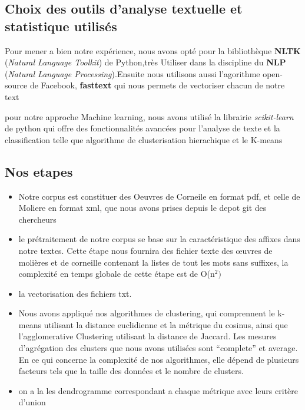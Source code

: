 \documentclass[]{report}
\begin{document}
\subsection{Choix des outils d'analyse textuelle et statistique utilisés}
\vspace{\baselineskip}
\hspace{0,5cm} Pour mener a bien notre expérience, nous avons opté pour la
bibliothèque  \textbf{NLTK} (\textit{Natural Language Toolkit}) de Python,très
Utiliser dans la discipline du \textbf{NLP} (\textit{Natural Language
Processing}).Ensuite nous utilisons aussi l'agorithme open-source de Facebook,
\textbf{fasttext} qui nous permets de vectoriser chacun de notre text

pour notre approche Machine learning, nous avons utilisé la librairie
\textit{scikit-learn} de python qui offre des fonctionnalités avancées pour
l'analyse de texte et la classification telle que algorithme de clusterisation
hierachique et le K-means 
\subsection{Nos etapes } 

\begin{itemize}
\item Notre corpus est constituer des Oeuvres de Corneile en format pdf, et
celle de Moliere  en format xml, que nous avons prises depuis le depot git des
chercheurs 
\item le prétraitement de notre corpus se base sur la caractéristique des
affixes dans notre textes. Cette étape nous fournira des fichier texte des
œuvres de molières et de corneille contenant la listes de tout les mots sans
suffixes, la complexité en temps globale de cette étape est de O(n\(^2)\)
\item la vectorisation des fichiers txt.
\item Nous avons appliqué nos algorithmes de clustering, qui comprennent le
k-means utilisant la distance euclidienne et la métrique du cosinus, ainsi que
l'agglomerative Clustering utilisant la distance de Jaccard. Les mesures
d'agrégation des clusters que nous avons utilisées sont ``complete'' et
average. En ce qui concerne la complexité de nos algorithmes, elle dépend de
plusieurs facteurs tels que la taille des données et le nombre de clusters. 
\item  on a la les dendrogramme correspondant a chaque métrique avec leurs
critère d'union
\end{itemize}
\end{document}
